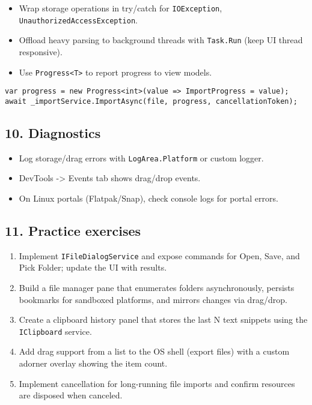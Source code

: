 \begin{itemize}
\tightlist
\item
  Wrap storage operations in try/catch for
  \passthrough{\lstinline!IOException!},
  \passthrough{\lstinline!UnauthorizedAccessException!}.
\item
  Offload heavy parsing to background threads with
  \passthrough{\lstinline!Task.Run!} (keep UI thread responsive).
\item
  Use \passthrough{\lstinline!Progress<T>!} to report progress to view
  models.
\end{itemize}

\begin{lstlisting}
var progress = new Progress<int>(value => ImportProgress = value);
await _importService.ImportAsync(file, progress, cancellationToken);
\end{lstlisting}

\subsection{10. Diagnostics}\label{diagnostics-1}

\begin{itemize}
\tightlist
\item
  Log storage/drag errors with
  \passthrough{\lstinline!LogArea.Platform!} or custom logger.
\item
  DevTools -\textgreater{} Events tab shows drag/drop events.
\item
  On Linux portals (Flatpak/Snap), check console logs for portal errors.
\end{itemize}

\subsection{11. Practice exercises}\label{practice-exercises-10}

\begin{enumerate}
\def\labelenumi{\arabic{enumi}.}
\tightlist
\item
  Implement \passthrough{\lstinline!IFileDialogService!} and expose
  commands for Open, Save, and Pick Folder; update the UI with results.
\item
  Build a file manager pane that enumerates folders asynchronously,
  persists bookmarks for sandboxed platforms, and mirrors changes via
  drag/drop.
\item
  Create a clipboard history panel that stores the last N text snippets
  using the \passthrough{\lstinline!IClipboard!} service.
\item
  Add drag support from a list to the OS shell (export files) with a
  custom adorner overlay showing the item count.
\item
  Implement cancellation for long-running file imports and confirm
  resources are disposed when canceled.
\end{enumerate}

